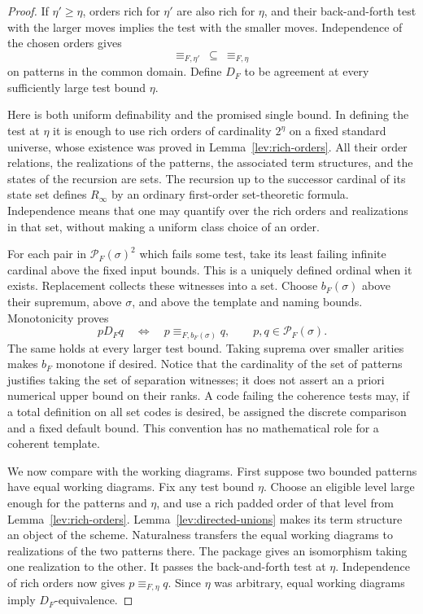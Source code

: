 \begin{proof}
If $\eta'\geq\eta$, orders rich for $\eta'$ are also rich for $\eta$,
and their back-and-forth test with the larger moves implies the test
with the smaller moves.  Independence of the chosen orders gives
\[
              \equiv_{F,\eta'}\ \subseteq\ \equiv_{F,\eta}
\]
on patterns in the common domain.  Define $D_F$ to be agreement at
every sufficiently large test bound $\eta$.

Here is both uniform definability and the promised single bound.
In defining the test at $\eta$ it is enough to use rich orders of
cardinality $2^\eta$ on a fixed standard universe, whose existence
was proved in Lemma~\ref{lev:rich-orders}.  All their order relations,
the realizations of the patterns, the associated term structures,
and the states of the recursion are sets.  The recursion up to the
successor cardinal of its state set defines $R_\infty$ by an ordinary
first-order set-theoretic formula.  Independence means that one may
quantify over the rich orders and realizations in that set, without
making a uniform class choice of an order.

For each pair in $\mathcal P_F(\sigma)^2$ which fails some test,
take its least failing infinite cardinal above the fixed input bounds.
This is a uniquely defined ordinal when it exists.  Replacement
collects these witnesses into a set.  Choose $b_F(\sigma)$ above
their supremum, above $\sigma$, and above the template and naming
bounds.  Monotonicity proves
\[
 p\mathrel{D_F}q
 \quad\Longleftrightarrow\quad
 p\equiv_{F,b_F(\sigma)}q,
 \qquad p,q\in\mathcal P_F(\sigma).
\]
The same holds at every larger test bound.  Taking suprema over
smaller arities makes $b_F$ monotone if desired.  Notice that the
cardinality of the set of patterns justifies taking the set of
separation witnesses; it does not assert an a priori numerical
upper bound on their ranks.  A code failing the coherence tests may,
if a total definition on all set codes is desired, be assigned the
discrete comparison and a fixed default bound.  This convention has
no mathematical role for a coherent template.

We now compare with the working diagrams.  First suppose two bounded
patterns have equal working diagrams.  Fix any test bound $\eta$.
Choose an eligible level large enough for the patterns and $\eta$,
and use a rich padded order of that level from
Lemma~\ref{lev:rich-orders}.  Lemma~\ref{lev:directed-unions} makes
its term structure an object of the scheme.  Naturalness transfers
the equal working diagrams to realizations of the two patterns
there.  The package gives an isomorphism taking one realization to
the other.  It passes the back-and-forth test at $\eta$.  Independence
of rich orders now gives $p\equiv_{F,\eta}q$.  Since $\eta$ was
arbitrary, equal working diagrams imply $D_F$-equivalence.


\end{proof}
